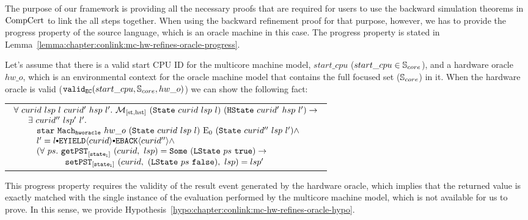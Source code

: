 The purpose of our framework is providing all the necessary proofs that are required 
for users to use the backward simulation theorems in $\mathrm{CompCert}$ to link the all steps together. 
When using the backward refinement proof for that purpose, however, we has to provide the progress property of the 
source language, which is an oracle machine in this case. 
The progress property is stated in Lemma~\ref{lemma:chapter:conlink:mc-hw-refines-oracle-progress}.

\begin{lemma}
\label{lemma:chapter:conlink:mc-hw-refines-oracle-progress}

Let's assume that there is a valid start CPU ID for the multicore machine model, 
$start\_cpu$ ($start\_cpu \in {\mathbb{S}_{core}}$), and a hardware oracle $hw\_o$,  
which is an environmental context for the oracle machine model that contains the full focused set (${\mathbb{S}_{core}}$) in it.
When the hardware oracle is valid ($ {{\mathrm{\texttt{valid}}}_{{\mathrm{\texttt{EC}}}}}({start\_cpu}, {{\mathbb{S}_{core}}}, {hw\_o})$) we can show the following fact:
\begin{center}
\begin{tabular}{P{0.95\textwidth}}
$
\begin{array}{l}
\forall \ curid \ lsp \ l \ curid' \ hsp \ l' . \ \matchstatehstate{(\mcstate{curid}{lsp}{l})}{(\hstate{curid'}{hsp}{l'})} \rightarrow \\
\ \ \ \ \  \exists \ curid'' \ lsp' \ l'  . \ \\
\ \ \ \ \   \ \ \ \ccstarstep{\oraclestep{hw\_o}{(\mcstate{curid}{lsp}{l})}{\ccemptytrace}{(\mcstate{curid''}{lsp}{l'})}} \wedge\\
\ \ \ \ \   \ \ \ l' = \listconsoppo{\yieldbackev{curid''}}{\listconsoppo{\yieldev{curid}}{l}} \wedge\\
\ \ \ \ \   \ \ \ (\forall \ ps  . \ \getpstsome{\localstatekwd}{curid}{lsp}{(\localstate{ps}{\btrue})} \rightarrow \\
\ \ \ \ \    \ \ \ \ \ \ \ \ \ \ \ \ \ \setpst{\localstatekwd}{curid}{(\localstate{ps}{\bfalse})}{lsp}{lsp'} \\
\end{array}
$
\end{tabular}
\end{center}
\end{lemma}
This progress property requires the validity of the result event generated by the hardware oracle, which implies
that the returned value is exactly matched with the single instance of the evaluation performed 
by the multicore machine model, which is not available for us to prove. 
In this sense, we  provide Hypothesis~\ref{hypo:chapter:conlink:mc-hw-refines-oracle-hypo}.

